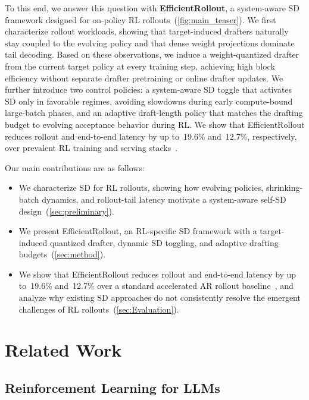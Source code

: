 \documentclass{llmxive}
\providecommand{\methodtitle}{EfficientRollout}
\providecommand{\speedupete}{12.7\%}
\providecommand{\speeduprollout}{19.6\%}
\begin{document}
To this end, we answer this question with \textbf{\methodtitle}, a system-aware SD framework designed for on-policy RL rollouts~(\cref{fig:main_teaser}).
We first characterize rollout workloads, showing that target-induced drafters naturally stay coupled to the evolving policy and that dense weight projections dominate tail decoding.
Based on these observations, we induce a weight-quantized drafter from the current target policy at every training step, achieving high block efficiency without separate drafter pretraining or online drafter updates.
We further introduce two control policies: a system-aware SD toggle that activates SD only in favorable regimes, avoiding slowdowns during early compute-bound large-batch phases, and an adaptive draft-length policy that matches the drafting budget to evolving acceptance behavior during RL.
We show that \methodtitle{} reduces rollout and end-to-end latency by up to~\speeduprollout{} and~\speedupete{}, respectively, over prevalent RL training and serving stacks~\citep{sheng2025hybridflow,kwon2023efficient}.

Our main contributions are as follows:

\begin{itemize}[leftmargin=*]
\item We characterize SD for RL rollouts, showing how evolving policies, shrinking-batch dynamics, and rollout-tail latency motivate a system-aware self-SD design~(\cref{sec:preliminary}).
\item We present \methodtitle{}, an RL-specific SD framework with a target-induced quantized drafter, dynamic SD toggling, and adaptive drafting budgets~(\cref{sec:method}).
\item We show that \methodtitle{} reduces rollout and end-to-end latency by up to~\speeduprollout{} and~\speedupete{} over a standard accelerated AR rollout baseline~\citep{sheng2025hybridflow,kwon2023efficient}, and analyze why existing SD approaches do not consistently resolve the emergent challenges of RL rollouts~(\cref{sec:Evaluation}).
\end{itemize}

\section{Related Work}
\label{sec:related-work}

\subsection{Reinforcement Learning for LLMs}
\end{document}
